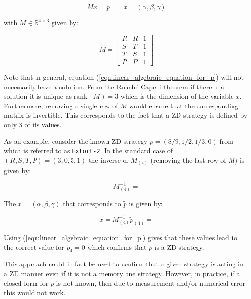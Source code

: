 \documentclass[a4paper]{article}
\begin{document}
\begin{equation}\label{eqn:linear_algebraic_equation_for_p}
    Mx=\tilde p  \qquad x=(\alpha, \beta, \gamma)
\end{equation}

with \(M\in\mathbb{R}^{4\times 3}\) given by:

\begin{equation}\label{eqn:definition_of_M}
    M =
    \begin{bmatrix}
        R & R & 1\\
        S & T & 1\\
        T & S & 1\\
        P & P & 1
    \end{bmatrix}
\end{equation}

Note that in general, equation (\ref{eqn:linear_algebraic_equation_for_p}) will
not necessarily have a solution. From the Rouch\'{e}-Capelli theorem if there is
a solution it is unique as \(\text{rank}(M)=3\) which is the dimension of the
variable \(x\). Furthermore, removing a single row of \(M\) would ensure that
the corresponding matrix is invertible. This corresponds to the fact that a ZD
strategy is defined by only 3 of its values.

As an example, consider the known ZD strategy \(p=(8 / 9, 1 / 2, 1 / 3, 0)\)
from~\cite{Stewart2012} which is referred to as \texttt{Extort-2}. In the
standard case of \((R, S, T, P)=(3, 0, 5, 1)\) the inverse
of \(M_{(4)}\) (removing the last row of \(M\)) is given by:

\begin{equation}\label{eqn:inverse_of_M4}
    M_{(4)}^{-1} =
    
\end{equation}

The \(x=(\alpha, \beta, \gamma)\) that corresponds to
\(\tilde p\) is given by:

\begin{equation}\label{eqn:alpha_beta_gamma_for_extort_2}
    x = M_{(4)}^{-1}\tilde p_{(4)} =
    
\end{equation}

Using (\ref{eqn:linear_algebraic_equation_for_p}) gives that these values lead
to the correct value for \(p_4=0\) which confirms that \(p\) is a ZD strategy.

This approach could in fact be used to confirm that a given strategy is acting
in a ZD manner even if it is not a memory one strategy. However, in practice, if
a closed form for \(p\) is not known, then due to measurement and/or numerical
error this would not work.
\end{document}
